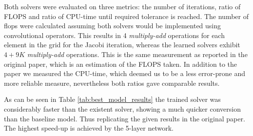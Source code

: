 \documentclass{rescience} %
\begin{document}
Both solvers were evaluated on three metrics: the number of iterations, ratio of FLOPS and ratio of CPU-time until required tolerance is reached. The number of flops were calculated assuming both solvers would be implemented using convolutional operators. This results in 4 \textit{multiply-add} operations for each element in the grid for the Jacobi iteration, whereas the learned solvers exhibit $4+9K$ \textit{multiply-add} operations. This is the same measurement as reported in the original paper, which is an estimation of the FLOPS taken. In addition to the paper we measured the CPU-time, which deemed us to be a less error-prone and more reliable measure, nevertheless both ratios gave comparable results.

As can be seen in Table \ref{tab:best_model_results} the trained solver was considerably faster than the existent solver, showing a much quicker conversion than the baseline model. Thus replicating the given results in the original paper. The highest speed-up is achieved by the 5-layer network.
\end{document}
